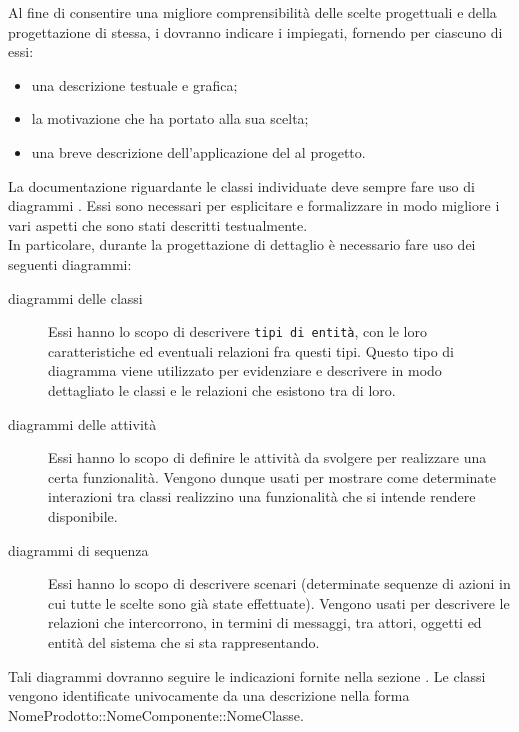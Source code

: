 				 \label{sec:ProgDetDesingPattern}
					Al fine di consentire una migliore comprensibilità  delle scelte progettuali e della progettazione di stessa, i  dovranno indicare i  impiegati, fornendo per ciascuno di essi:
					\begin{itemize}
						\item una descrizione testuale e grafica;
						\item la motivazione che ha portato alla sua scelta;
						\item una breve descrizione dell'applicazione del  al progetto.
					\end{itemize}
				 \label{sec:ProgDetUML}
					La documentazione riguardante le classi individuate deve sempre fare uso di diagrammi . Essi sono necessari per esplicitare e formalizzare in modo migliore i vari aspetti che sono stati descritti testualmente.\\
					In particolare, durante la progettazione di dettaglio è necessario fare uso dei seguenti diagrammi:
					\begin{description}
						\item[diagrammi delle classi] Essi hanno lo scopo di descrivere \texttt{tipi di entità}, con le loro caratteristiche ed eventuali relazioni fra questi tipi. Questo tipo di diagramma viene utilizzato per evidenziare e descrivere in modo dettagliato le classi e le relazioni che esistono tra di loro.
						\item[diagrammi delle attività] Essi hanno lo scopo di definire le attività da svolgere per realizzare una certa funzionalità. Vengono dunque usati per mostrare come determinate interazioni tra classi realizzino una funzionalità che si intende rendere disponibile.
						\item[diagrammi di sequenza] Essi hanno lo scopo di descrivere scenari (determinate sequenze di azioni in cui tutte le scelte sono già state effettuate). Vengono usati per descrivere le relazioni che intercorrono, in termini di messaggi, tra attori, oggetti ed entità del sistema che si sta rappresentando.
					\end{description}
					Tali diagrammi dovranno seguire le indicazioni fornite nella sezione .
				 \label{sec:ClassificareClassi}
					Le classi vengono identificate univocamente da una descrizione nella forma\\ NomeProdotto::NomeComponente::NomeClasse.
